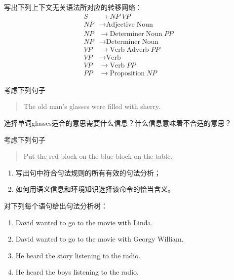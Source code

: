 \begin{question}
写出下列上下文无关语法所对应的转移网络：\\
	\begin{align*}
	S & \to \mathit{NP} \; \mathit{VP} \\
	\mathit{NP} & \to \text{Adjective} \; \text{Noun} \\
	\mathit{NP} & \to \text{Determiner} \; \text{Noun} \; \mathit{PP} \\
	\mathit{NP} & \to \text{Determiner} \; \text{Noun} \\
	\mathit{VP} & \to \text{Verb} \; \text{Adverb} \; \mathit{PP} \\
	\mathit{VP} & \to \text{Verb} \\
	\mathit{VP} & \to \text{Verb} \; \mathit{PP} \\
	\mathit{PP} & \to \text{Proposition} \; \mathit{NP}
	\end{align*}
\end{question}
\begin{solution}
\end{solution}

\begin{question}
考虑下列句子
	\begin{quote}
	The old man's glasses were filled with sherry. 
	\end{quote}
选择单词glasses适合的意思需要什么信息？什么信息意味着不合适的意思？
\end{question}
\begin{solution}
\end{solution}

\begin{question}
考虑下列句子
	\begin{quote}
	Put the red block on the blue block on the table. 
	\end{quote}
	\begin{enumerate}
	\item 写出句中符合句法规则的所有有效的句法分析；
	\item 如何用语义信息和环境知识选择该命令的恰当含义。
	\end{enumerate}
\end{question}
\begin{solution}
\end{solution}

\begin{question}
对下列每个语句给出句法分析树：
	\begin{enumerate}
	\item David wanted to go to the movie with Linda. 
	\item David wanted to go to the movie with Georgy William.
	\item He heard the story listening to the radio. 
	\item He heard the boys listening to the radio. 
	\end{enumerate}
\end{question}
\begin{solution}
\end{solution}

